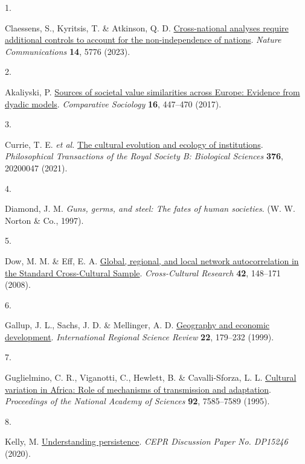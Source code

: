 \documentclass[
  man, donotrepeattitle,floatsintext]{apa6}
\newlength{\cslhangindent}
\newlength{\csllabelwidth}
\newlength{\cslentryspacingunit} %
\newenvironment{CSLReferences}[2] %
 {%
  \setlength{\parindent}{0pt}
  \ifodd #1
  \let\oldpar\par
  \def\par{\hangindent=\cslhangindent\oldpar}
  \fi
  \setlength{\parskip}{#2\cslentryspacingunit}
 }%
 {}
\newcommand{\CSLLeftMargin}[1]{\parbox[t]{\csllabelwidth}{#1}}
\newcommand{\CSLRightInline}[1]{\parbox[t]{\linewidth - \csllabelwidth}{#1}\break}
\begin{document}
\hypertarget{refs}{}
\begin{CSLReferences}{0}{0}
\leavevmode{}%
\CSLLeftMargin{1. }%
\CSLRightInline{Claessens, S., Kyritsis, T. \& Atkinson, Q. D. \href{https://doi.org/10.1038/s41467-023-41486-1}{Cross-national analyses require additional controls to account for the non-independence of nations}. \emph{Nature Communications} \textbf{14}, 5776 (2023).}

\leavevmode{}%
\CSLLeftMargin{2. }%
\CSLRightInline{Akaliyski, P. \href{https://doi.org/10.1163/15691330-12341432}{Sources of societal value similarities across {Europe}: Evidence from dyadic models}. \emph{Comparative Sociology} \textbf{16}, 447--470 (2017).}

\leavevmode{}%
\CSLLeftMargin{3. }%
\CSLRightInline{Currie, T. E. \emph{et al.} \href{https://doi.org/10.1098/rstb.2020.0047}{The cultural evolution and ecology of institutions}. \emph{Philosophical Transactions of the Royal Society B: Biological Sciences} \textbf{376}, 20200047 (2021).}

\leavevmode{}%
\CSLLeftMargin{4. }%
\CSLRightInline{Diamond, J. M. \emph{Guns, germs, and steel: The fates of human societies}. (W. W. Norton \& Co., 1997).}

\leavevmode{}%
\CSLLeftMargin{5. }%
\CSLRightInline{Dow, M. M. \& Eff, E. A. \href{https://doi.org/10.1177/1069397107311186}{Global, regional, and local network autocorrelation in the {Standard Cross-Cultural Sample}}. \emph{Cross-Cultural Research} \textbf{42}, 148--171 (2008).}

\leavevmode{}%
\CSLLeftMargin{6. }%
\CSLRightInline{Gallup, J. L., Sachs, J. D. \& Mellinger, A. D. \href{https://doi.org/10.1177/016001799761012334}{Geography and economic development}. \emph{International Regional Science Review} \textbf{22}, 179--232 (1999).}

\leavevmode{}%
\CSLLeftMargin{7. }%
\CSLRightInline{Guglielmino, C. R., Viganotti, C., Hewlett, B. \& Cavalli-Sforza, L. L. \href{https://doi.org/10.1073/pnas.92.16.7585}{Cultural variation in {Africa}: Role of mechanisms of transmission and adaptation}. \emph{Proceedings of the National Academy of Sciences} \textbf{92}, 7585--7589 (1995).}

\leavevmode{}%
\CSLLeftMargin{8. }%
\CSLRightInline{Kelly, M. \href{http://ssrn.com/abstract=3688200}{Understanding persistence}. \emph{CEPR Discussion Paper No. DP15246} (2020).}


\end{CSLReferences}
\end{document}
